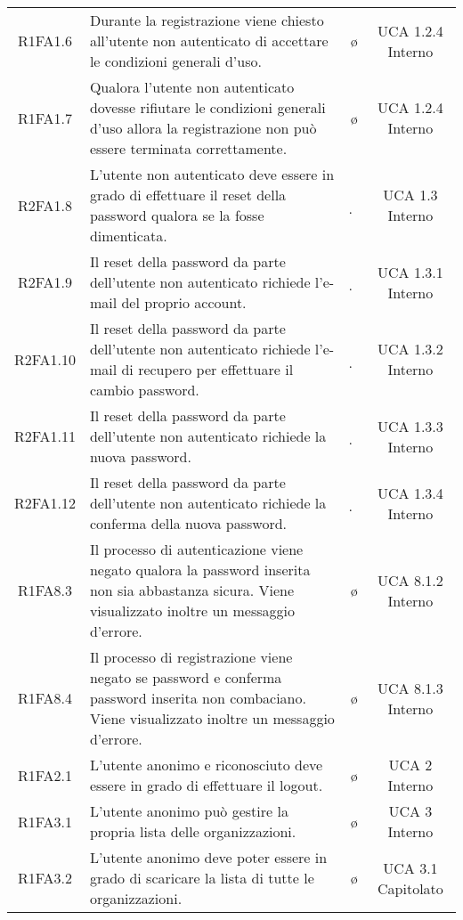 {\begin{longtable}{ c C{6.5cm} c c}
R1FA1.6 & Durante la registrazione viene chiesto all'utente non autenticato di accettare le condizioni generali d'uso. & \o & UCA 1.2.4 Interno\\

R1FA1.7 & Qualora l'utente non autenticato dovesse rifiutare le condizioni generali d'uso allora la registrazione non può essere terminata correttamente.  & \o & UCA 1.2.4 Interno\\

R2FA1.8 & L'utente non autenticato deve essere in grado di effettuare il reset della password qualora se la fosse dimenticata. & \d & UCA 1.3 Interno\\

R2FA1.9 & Il reset della password da parte dell'utente non autenticato richiede l'e-mail del proprio account. & \d & UCA 1.3.1 Interno\\

R2FA1.10 & Il reset della password da parte dell'utente non autenticato richiede l'e-mail di recupero per effettuare il cambio password. & \d & UCA 1.3.2 Interno\\

R2FA1.11 & Il reset della password da parte dell'utente non autenticato richiede la nuova password. & \d & UCA 1.3.3 Interno\\

R2FA1.12 & Il reset della password da parte dell'utente non autenticato richiede la conferma della nuova password. & \d & UCA 1.3.4 Interno\\

R1FA8.3 & Il processo di autenticazione viene negato qualora la password inserita non sia abbastanza sicura. Viene visualizzato inoltre un messaggio d'errore. & \o & UCA 8.1.2 Interno\\

R1FA8.4 & Il processo di registrazione viene negato se password e conferma password inserita non combaciano. Viene visualizzato inoltre un messaggio d'errore. & \o & UCA 8.1.3 Interno\\



R1FA2.1 & L'utente anonimo e riconosciuto deve essere in grado di effettuare il logout. & \o & UCA 2 Interno\\

R1FA3.1 & L'utente anonimo può gestire la propria lista delle organizzazioni. & \o & UCA 3 Interno\\

R1FA3.2 & L'utente anonimo deve poter essere in grado di scaricare la lista di tutte le organizzazioni. & \o & UCA 3.1 Capitolato \\


\end{longtable}}
